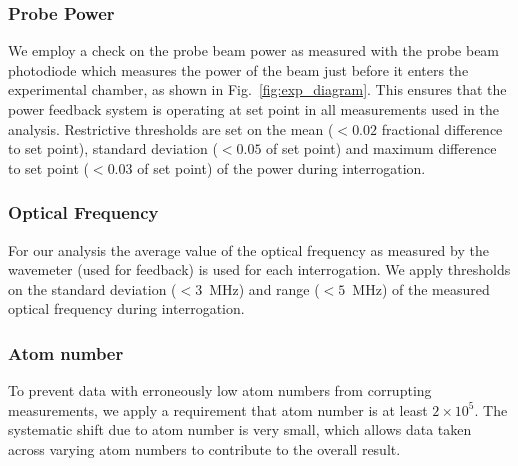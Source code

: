 \documentclass[%
 amsmath,amssymb,
aps,
]{revtex4-2}
\begin{document}
\subsubsection{Probe Power}
We employ a check on the probe beam power as measured with the probe beam photodiode which measures the power of the beam just before it enters the experimental chamber, as shown in Fig.~\ref{fig:exp_diagram}. This ensures that the power feedback system is operating at set point in all measurements used in the analysis. Restrictive thresholds are set on the mean ($<0.02$ fractional difference to set point), standard deviation ($<0.05$ of set point) and maximum difference to set point ($<0.03$ of set point) of the power during interrogation.
\subsubsection{Optical Frequency}
For our analysis the average value of the optical frequency as measured by the wavemeter (used for feedback) is used for each interrogation. We apply thresholds on the standard deviation ($<3$~MHz) and range ($<5$~MHz) of the measured optical frequency during interrogation.
\subsubsection{Atom number}
To prevent data with erroneously low atom numbers from corrupting measurements, we apply a requirement that atom number is at least $2\times10^{5}$. The systematic shift due to atom number is very small, which allows data taken across varying atom numbers to contribute to the overall result.
\end{document}
